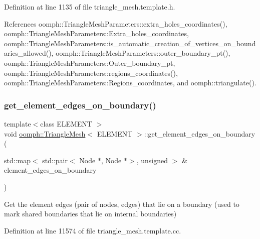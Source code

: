 Definition at line 1135 of file triangle\+\_\+mesh.\+template.\+h.



References oomph\+::\+Triangle\+Mesh\+Parameters\+::extra\+\_\+holes\+\_\+coordinates(), oomph\+::\+Triangle\+Mesh\+Parameters\+::\+Extra\+\_\+holes\+\_\+coordinates, oomph\+::\+Triangle\+Mesh\+Parameters\+::is\+\_\+automatic\+\_\+creation\+\_\+of\+\_\+vertices\+\_\+on\+\_\+boundaries\+\_\+allowed(), oomph\+::\+Triangle\+Mesh\+Parameters\+::outer\+\_\+boundary\+\_\+pt(), oomph\+::\+Triangle\+Mesh\+Parameters\+::\+Outer\+\_\+boundary\+\_\+pt, oomph\+::\+Triangle\+Mesh\+Parameters\+::regions\+\_\+coordinates(), oomph\+::\+Triangle\+Mesh\+Parameters\+::\+Regions\+\_\+coordinates, and oomph\+::triangulate().

\mbox{\label{classoomph_1_1TriangleMesh_a9eecb633a813252086fd7fd9ba0b2635}} 
\subsubsection{\texorpdfstring{get\+\_\+element\+\_\+edges\+\_\+on\+\_\+boundary()}{get\_element\_edges\_on\_boundary()}}
{\footnotesize\ttfamily template$<$class E\+L\+E\+M\+E\+NT $>$ \\
void \hyperlink{classoomph_1_1TriangleMesh}{oomph\+::\+Triangle\+Mesh}$<$ E\+L\+E\+M\+E\+NT $>$\+::get\+\_\+element\+\_\+edges\+\_\+on\+\_\+boundary (\begin{DoxyParamCaption}\item[{std\+::map$<$ std\+::pair$<$ Node $\ast$, Node $\ast$$>$, unsigned $>$ \&}]{element\+\_\+edges\+\_\+on\+\_\+boundary }\end{DoxyParamCaption})\hspace{0.3cm}{\ttfamily [protected]}}



Get the element edges (pair of nodes, edges) that lie on a boundary (used to mark shared boundaries that lie on internal boundaries) 



Definition at line 11574 of file triangle\+\_\+mesh.\+template.\+cc.

